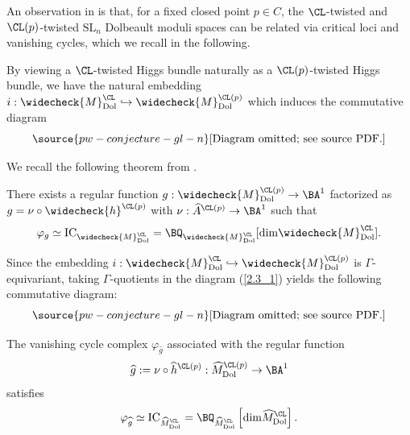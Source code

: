 An observation in \cite[Section 4]{MS} is that, for a fixed closed point $p\in C$, the $\CL$-twisted and $\CL(p)$-twisted $\mathrm{SL}_n$ Dolbeault moduli spaces can be related via critical loci and vanishing cycles, which we recall in the following.

By viewing a $\CL$-twisted Higgs bundle naturally as a $\CL(p)$-twisted Higgs bundle, we have the natural embedding $i: \widecheck{M}^\CL_{\mathrm{Dol}} \hookrightarrow \widecheck{M}^{\CL(p)}_{\mathrm{Dol}}$ which induces the commutative diagram
\begin{equation}\label{2.3_1}
\source{pw-conjecture-gl-n}
\text{[Diagram omitted; see source PDF.]}
\end{equation}

We recall the following theorem from \cite{MS}.

\begin{thm}
\notready\label{thm2.5}
There exists a regular function $g: \widecheck{M}^{\CL(p)}_{\mathrm{Dol}} \to \BA^1$ factorized as $g = \nu \circ \widecheck{h}^{\CL(p)}$ with $\nu: \widehat{A}^{\CL(p)} \to \BA^1$ such that
\[
\varphi_g \simeq \mathrm{IC}_{\widecheck{M}^{\CL}_{\mathrm{Dol}}} = \BQ_{\widecheck{M}^{\CL}_{\mathrm{Dol}}}[\mathrm{dim} \widecheck{M}^{\CL}_{\mathrm{Dol}}].
\]
\end{thm}

Since the embedding $i: \widecheck{M}^\CL_{\mathrm{Dol}} \hookrightarrow \widecheck{M}^{\CL(p)}_{\mathrm{Dol}}$ is $\Gamma$-equivariant, taking $\Gamma$-quotients in the diagram (\ref{2.3_1}) yields the following commutative diagram:
\begin{equation}\label{diagram3}
\source{pw-conjecture-gl-n}
\text{[Diagram omitted; see source PDF.]}
\end{equation}


\begin{prop}
\notready\label{prop2.6}
The vanishing cycle complex $\varphi_{\widehat{g}}$ associated with the regular function
\[
\widehat{g}: = \nu \circ \widehat{h}^{\CL(p)}: \widehat{M}^{\CL(p)}_{\mathrm{Dol}} \to \BA^1
\]
satisfies
\[
\varphi_{\widehat{g}} \simeq \mathrm{IC}_{\widehat{M}^{\CL}_{\mathrm{Dol}}} = \BQ_{\widehat{M}^{\CL}_{\mathrm{Dol}}}\left[\mathrm{dim} \widehat{M}^{\CL}_{\mathrm{Dol}}\right].\]
\end{prop}


